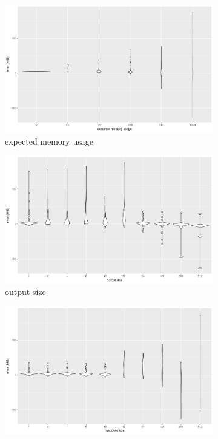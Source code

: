 \documentclass{article}
\begin{document}
\begin{figure}
  \centering
  \begin{subfigure}[t]{0.49\textwidth}
    \centering
    \includegraphics[width=\textwidth]{../local_experiments/io_memory_tests/plots/posterior_error_exp.png}
    \caption{expected memory usage}
    \label{fig:posterior_violin_memory}
  \end{subfigure}
  \begin{subfigure}[t]{0.49\textwidth}
    \centering
    \includegraphics[width=\textwidth]{../local_experiments/io_memory_tests/plots/posterior_error_output.png}
    \caption{output size}
    \label{fig:posterior_violin_output}
  \end{subfigure}
  \begin{subfigure}[t]{0.49\textwidth}
    \centering
    \includegraphics[width=\textwidth]{../local_experiments/io_memory_tests/plots/posterior_error_response.png}

\end{subfigure}
\end{figure}
\end{document}
